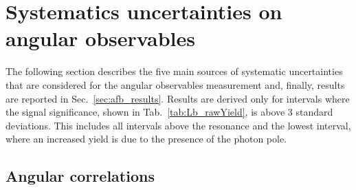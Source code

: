 \section{Systematics uncertainties on angular observables}
\label{sec:ang_results}

The following section describes the five main sources of systematic uncertainties
that are considered for the angular observables measurement and, finally, results are
reported in Sec.~\ref{sec:afb_results}. Results are derived only for \qsq intervals
where the signal significance, shown in Tab.~\ref{tab:Lb_rawYield}, is above 3 standard
deviations. This includes all \qsq intervals above the \jpsi resonance and the lowest 
\qsq interval, where an increased yield is due to the presence of the photon pole.



\subsection{Angular correlations}

